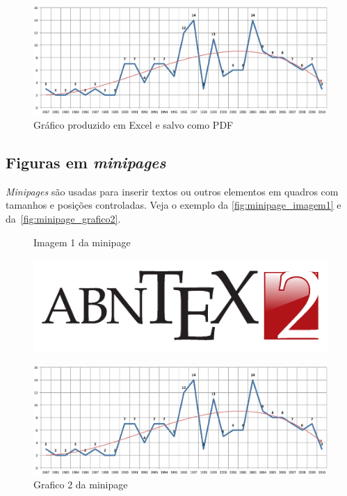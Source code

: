 \begin{figure}[htb]
\caption{%
\label{fig:grafico}Gráfico produzido em Excel e salvo como PDF}
\begin{center}
  \includegraphics[scale=0.5]{graph.pdf}
\end{center}
\end{figure}

\subsection{Figuras em \emph{minipages}}

\emph{Minipages} são usadas para inserir textos ou outros elementos em quadros
com tamanhos e posições controladas. Veja o exemplo da
\autoref{fig:minipage_imagem1} e da~\autoref{fig:minipage_grafico2}.

\begin{figure}[htb]%
\label{fig:teste}
\centering
  \begin{minipage}{0.4\textwidth}
    \centering
\caption{Imagem 1 da minipage}%
\label{fig:minipage_imagem1}
    \includegraphics[scale=0.9]{logo.pdf}
  \end{minipage}
  \hfill
  \begin{minipage}{0.4\textwidth}
    \centering
\caption{Grafico 2 da minipage}%
\label{fig:minipage_grafico2}
    \includegraphics[scale=0.2]{graph.pdf}
  \end{minipage}
\end{figure}

